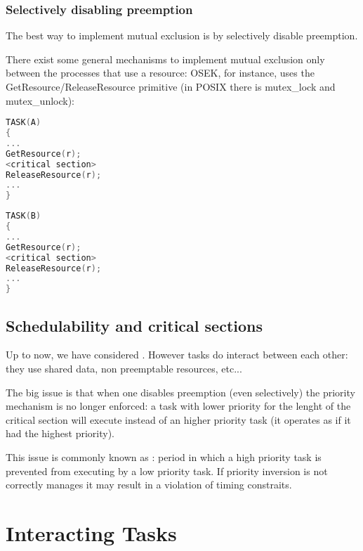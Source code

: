 \subsubsection{Selectively disabling preemption}
The best way to implement mutual exclusion is by selectively disable preemption.

There exist some general mechanisms to implement mutual exclusion only between the processes that use a resource: OSEK, for instance, uses the GetResource/ReleaseResource primitive (in POSIX there is mutex\_lock and mutex\_unlock):

\begin{minipage}{0.475\textwidth}
\centering
\begin{lstlisting}[language=C++]
TASK(A)
{
...
GetResource(r);
<critical section>
ReleaseResource(r);
...
}
\end{lstlisting}
\end{minipage}
\hfill
\begin{minipage}{0.475\textwidth}
\centering
\begin{lstlisting}[language=C++]
TASK(B)
{
...
GetResource(r);
<critical section>
ReleaseResource(r);
...
}
\end{lstlisting}
\end{minipage}

\subsection{Schedulability and critical sections}

Up to now, we have considered . However tasks do interact between each other: they use shared data, non preemptable resources, etc...

The big issue is that when one disables preemption (even selectively) the priority mechanism is no longer enforced: a task with lower priority for the lenght of the critical section will execute instead of an higher priority task (it operates as if it had the highest priority).



This issue is commonly known as : period in which a high priority task is prevented from executing by a low priority task. If priority inversion is not correctly manages it may result in a violation of timing constraits.


\section{Interacting Tasks}

